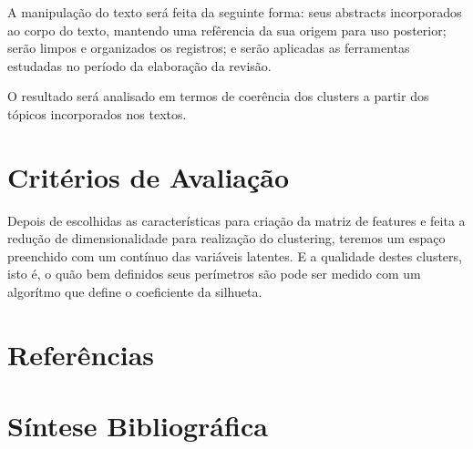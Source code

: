 \documentclass[
	12pt,				%
	a4paper,			%
	english,			%
	brazil,				%
	]{article}
\begin{document}
    A manipula\c c\~ ao do texto ser\' a feita da seguinte forma: seus abstracts incorporados ao corpo do texto, mantendo uma refêrencia da sua origem para uso posterior; ser\~ ao limpos e organizados os registros; e ser\~ ao aplicadas as ferramentas estudadas no período da elabora\c c\~ ao da revis\~ ao.

    O resultado ser\' a analisado em termos de coerência dos clusters a partir dos tópicos incorporados nos textos.

\section{Crit\' erios de Avalia\c c\~ ao} 

	Depois de escolhidas as caracter\' isticas para cria{\c c}\~ ao da matriz de features e feita a redu{\c c}\~ ao de dimensionalidade para realiza{\c c}\~ ao do clustering, teremos um espa{\c c}o preenchido com um cont\' inuo das vari\' aveis latentes. E a qualidade destes clusters, isto é, o qu\~ ao bem definidos seus per\' imetros s\~ ao pode ser medido com um algor\' itmo que define o coeficiente da silhueta.
    
    
    



\renewcommand\refname{}
\section{Refer\^ encias}

    \vspace{-4.3em}
    
    
\section{S\' intese Bibliogr\' afica}

    \vspace{-3.5em}
    
 
\end{document}
